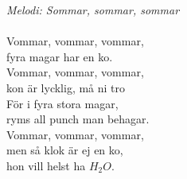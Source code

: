 {\footnotesize\textit{Melodi: Sommar, sommar, sommar}}\\
\\
Vommar, vommar, vommar,\\
fyra magar har en ko.\\
Vommar, vommar, vommar,\\
kon är lycklig, må ni tro\\
För i fyra stora magar,\\
ryms all punch man behagar.\\
Vommar, vommar, vommar,\\
men så klok är ej en ko,\\
hon vill helst ha $H_2O$.
